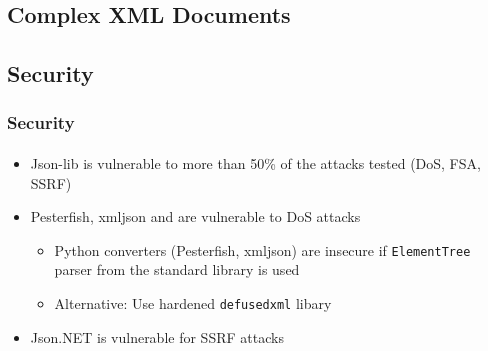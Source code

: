 \documentclass[
    alternativetitlepage=alternativ,
    cornerlogo=hgi_nds_logo2,
    sectionoverview,
]{rubpresentation}
\begin{document}
\begingroup
  \begin{frame}[fragile]
    \vspace{-1.15cm}
    \begin{center}
      
    \end{center}
  \end{frame}
\endgroup

\subsection{Complex XML Documents}

\begingroup
  \begin{frame}[fragile]
    \vspace{-1.15cm}
    \begin{center}
      
    \end{center}
  \end{frame}
\endgroup

\subsection{Security}

\begin{frame}
  \frametitle{Security}
  \framesubtitle{}
  \begin{itemize}
    \item{} Json-lib is vulnerable to more than 50\% of the attacks tested (DoS, FSA, SSRF)
    \item{} Pesterfish, xmljson and are vulnerable to DoS attacks
      \begin{itemize}
        \item{} Python converters (Pesterfish, xmljson) are insecure if \texttt{ElementTree} parser from the standard
          library is used
        \item{} Alternative: Use hardened \texttt{defusedxml} libary
      \end{itemize}
    \item{} Json.NET is vulnerable for SSRF attacks
  \end{itemize}
\end{frame}

\begingroup
  \begin{frame}[fragile]
    \vspace{-1.15cm}
    \begin{center}
      
    \end{center}
  \end{frame}
\endgroup
\end{document}
